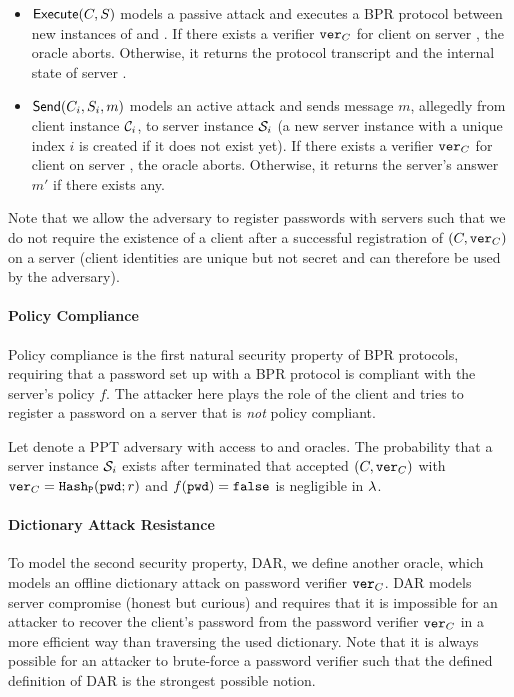 \begin{itemize}
  \item $\mathsf{Execute}(C,S)$ models a passive attack and executes a \ac{BPR} protocol between new instances of \Client and \Server.
        If there exists a verifier $\mathtt{ver}_C$ for client \Client on server \Server, the oracle aborts.
        Otherwise, it returns the protocol transcript and the internal state of server \Server.
  \item $\mathsf{Send}(C_i,S_i,m)$ models an active attack and sends message $m$, allegedly from client instance $\mathcal{C}_i$, to server instance $\mathcal{S}_i$ (a new server instance with a unique index $i$ is created if it does not exist yet).
        If there exists a verifier $\mathtt{ver}_C$ for client \Client on server \Server, the oracle aborts.
        Otherwise, it returns the server's answer $m'$ if there exists any.
\end{itemize}

\noindent
Note that we allow the adversary to register passwords with servers such that we do not require the existence of a client \Client after a successful registration of $(C,\mathtt{ver}_C)$ on a server (client identities \Client are unique but not secret and can therefore be used by the adversary).

\paragraph{Policy Compliance}
Policy compliance is the first natural security property of \ac{BPR} protocols, requiring that a password set up with a \ac{BPR} protocol is compliant with the server's policy $f$.
The attacker here plays the role of the client and tries to register a password \pwd on a server that is \emph{not} policy compliant.

\begin{definition}\label{def:pc}
Let \cA denote a \ac{PPT} adversary with access to \Execute and \Send oracles.
The probability that a server instance $\mathcal{S}_i$ exists after \cA terminated that accepted $(C,\mathtt{ver}_C)$ with $\mathtt{ver}_C=\mathtt{Hash_P}(\mathtt{pwd};r)$ and $f(\mathtt{pwd})=\mathtt{false}$ is negligible in $\lambda$.
\eod
\end{definition}

\paragraph{Dictionary Attack Resistance}
To model the second security property, \acl{DAR}, we define another oracle, which models an offline dictionary attack on password verifier $\mathtt{ver}_C$.
\ac{DAR} models server compromise (honest but curious) and requires that it is impossible for an attacker to recover the client's password from the password verifier $\mathtt{ver}_C$ in a more efficient way than traversing the used dictionary.
Note that it is always possible for an attacker to brute-force a password verifier such that the defined definition of \ac{DAR} is the strongest possible notion.

